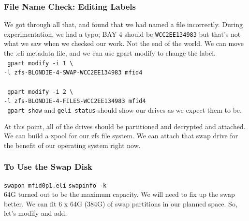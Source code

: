 \subsubsection{File Name Check:  Editing Labels}
We got through all that, and found that we had named a file incorrectly.  During experimentation, we had a typo; BAY 4 should be
\texttt{WCC2EE134983} but that's not what we saw when we checked our work.  Not the end of the world.  We can move the .eli  \gls{metadata} file, and we can use  gpart modify to change the label.\\

\noindent\texttt{ gpart modify -i 1 \textbackslash\\-l \gls{zfs}-BLONDIE-4-SWAP-WCC2EE134983 mfid4}\\\\
\texttt{ gpart modify -i 2 \textbackslash\\-l \gls{zfs}-BLONDIE-4-FILES-WCC2EE134983 mfid4}\\

\texttt{ gpart show} and \texttt{geli status} should show our drives as we expect them to be.

At this point, all of the drives should be partitioned and decrypted and attached.  We can build a zpool for our \gls{zfs} file system. We can attach that swap drive for the benefit of our  \gls{operating system} right now.

\subsubsection{To Use the Swap Disk}
\noindent\texttt{swapon mfid0p1.eli}
\texttt{swapinfo -k}\\

64G turned out to be the maximum capacity.  We will need to fix up the swap better.  We can fit 6 x 64G (384G) of swap partitions in our planned space.  So, let’s modify and add.\\

